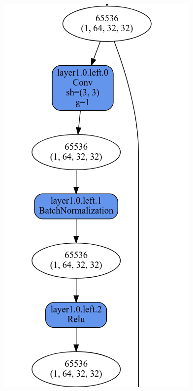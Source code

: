 \documentclass[UTF8]{ctexart}
\begin{document}
\begin{figure}[H]
    \centering
    \includegraphics[scale=0.3]{../images/resblock1.png}\\

\end{figure}
\end{document}
